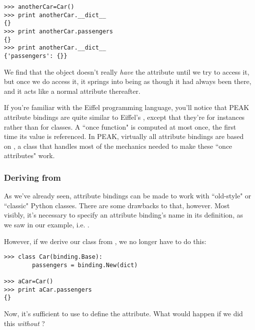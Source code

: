 \begin{verbatim}
>>> anotherCar=Car()
>>> print anotherCar.__dict__
{}
>>> print anotherCar.passengers
{}
>>> print anotherCar.__dict__
{'passengers': {}}

\end{verbatim}

We find that the object doesn't really \emph{have} the attribute until we
try to access it, but once we do access it, it springs into being as though
it had always been there, and it acts like a normal attribute thereafter.


If you're familiar with the Eiffel programming language, you'll notice that
PEAK attribute bindings are quite similar to Eiffel's ,
except that they're for instances rather than for classes.  A ``once function"
is computed at most once, the first time its value is referenced.  In PEAK,
virtually all attribute bindings are based on , a class
that handles most of the mechanics needed to make these ``once attributes" work.

\subsubsection{Deriving from }

As we've already seen, attribute bindings can be made to work with 
``old-style" or ``classic" Python classes.  There are some drawbacks to that,
however.  Most visibly, it's necessary to specify an attribute binding's
name in its definition, as we saw in our example, i.e. 
.

However, if we derive our class from , we no longer have
to do this:

\begin{verbatim}
>>> class Car(binding.Base):
        passengers = binding.New(dict)
	
>>> aCar=Car()
>>> print aCar.passengers
{}

\end{verbatim}

Now, it's sufficient to use  to define the attribute.
What would happen if we did this \emph{without} ?











